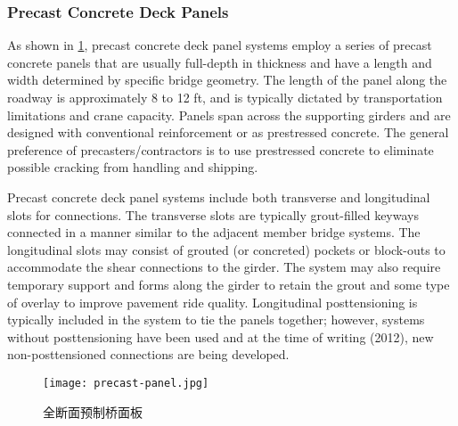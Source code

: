 \subsubsection{Precast Concrete Deck Panels}
As shown in \cref{fig:precast-panel}, precast concrete deck panel systems employ a series of precast concrete panels that are usually full-depth in thickness and have a length and width determined by specific bridge geometry. The length of the panel along the roadway is approximately 8 to 12 ft, and is typically dictated by transportation limitations and crane capacity. Panels span across the supporting girders and are designed with conventional reinforcement or as prestressed concrete. The general preference of precasters/contractors is to use prestressed concrete to eliminate possible cracking from handling and shipping.

Precast concrete deck panel systems include both transverse and longitudinal slots for connections. The transverse slots are typically grout-filled keyways connected in a manner similar to the adjacent member bridge systems. The longitudinal slots may consist of grouted (or concreted) pockets or block-outs to accommodate the shear connections to the girder. The system may also require temporary support and forms along the girder to retain the grout and some type of overlay to improve pavement ride quality. Longitudinal posttensioning is typically included in the system to tie the panels together; however, systems without posttensioning have been used and at the time of writing (2012), new non-posttensioned connections are being developed.

\begin{figure}
  \texttt{[image: precast-panel.jpg]}
  \caption{全断面预制桥面板}
  \label{fig:precast-panel}
\end{figure}

